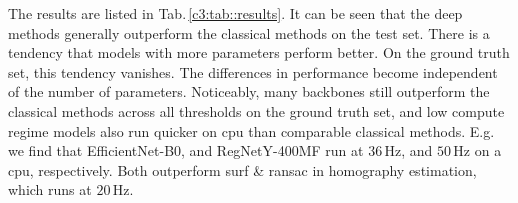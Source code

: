 


The results are listed in Tab.\,\ref{c3:tab::results}. It can be seen that the deep methods generally outperform the classical methods on the test set. There is a tendency that models with more parameters perform better. On the ground truth set, this tendency vanishes. The differences in performance become independent of the number of parameters. Noticeably, many backbones still outperform the classical methods across all thresholds on the ground truth set, and low compute regime models also run quicker on \gls{cpu} than comparable classical methods. E.g. we find that EfficientNet-B0, and RegNetY-400MF run at $36\,\text{Hz}$, and $50\,\text{Hz}$ on a \gls{cpu}, respectively. Both outperform \gls{surf} \& \gls{ransac} in homography estimation, which runs at $20\,\text{Hz}$.


